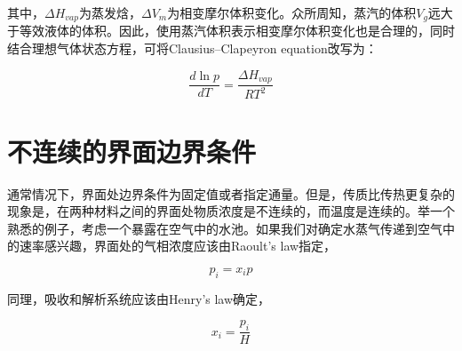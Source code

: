 其中，$ \Delta H_{vap} $为蒸发焓，$ \Delta V_m $为相变摩尔体积变化。众所周知，蒸汽的体积$ V_g $远大于等效液体的体积。因此，使用蒸汽体积表示相变摩尔体积变化也是合理的，同时结合理想气体状态方程，可将Clausius–Clapeyron equation改写为：

\begin{equation}
\frac{d\ln p}{dT} = \frac{\Delta H_{vap}}{RT^2}
\end{equation}

\section{不连续的界面边界条件}

通常情况下，界面处边界条件为固定值或者指定通量。但是，传质比传热更复杂的现象是，在两种材料之间的界面处物质浓度是不连续的，而温度是连续的。举一个熟悉的例子，考虑一个暴露在空气中的水池。如果我们对确定水蒸气传递到空气中的速率感兴趣，界面处的气相浓度应该由Raoult’s law指定，

\[ p_i = x_i p \]

同理，吸收和解析系统应该由Henry’s law确定，

\[ x_i = \frac{p_i}{H} \]










